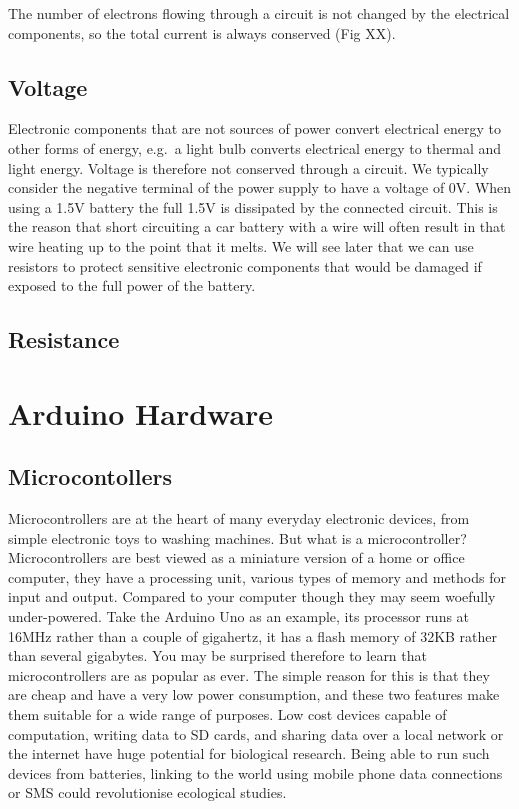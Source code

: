 \documentclass[
]{book}
\begin{document}
The number of electrons flowing through a circuit is not changed by the electrical components, so the total current is always conserved (Fig XX).

\section{Voltage}\label{voltage}

Electronic components that are not sources of power convert electrical energy to other forms of energy, e.g.~a light bulb converts electrical energy to thermal and light energy. Voltage is therefore not conserved through a circuit. We typically consider the negative terminal of the power supply to have a voltage of 0V. When using a 1.5V battery the full 1.5V is dissipated by the connected circuit. This is the reason that short circuiting a car battery with a wire will often result in that wire heating up to the point that it melts. We will see later that we can use resistors to protect sensitive electronic components that would be damaged if exposed to the full power of the battery.

\section{Resistance}\label{resistance}

\chapter{Arduino Hardware}\label{arduino-hardware}

\section{Microcontollers}\label{microcontollers}

Microcontrollers are at the heart of many everyday electronic devices, from simple electronic toys to washing machines. But what is a microcontroller? Microcontrollers are best viewed as a miniature version of a home or office computer, they have a processing unit, various types of memory and methods for input and output. Compared to your computer though they may seem woefully under-powered. Take the Arduino Uno as an example, its processor runs at 16MHz rather than a couple of gigahertz, it has a flash memory of 32KB rather than several gigabytes. You may be surprised therefore to learn that microcontrollers are as popular as ever. The simple reason for this is that they are cheap and have a very low power consumption, and these two features make them suitable for a wide range of purposes. Low cost devices capable of computation, writing data to SD cards, and sharing data over a local network or the internet have huge potential for biological research. Being able to run such devices from batteries, linking to the world using mobile phone data connections or SMS could revolutionise ecological studies.
\end{document}
